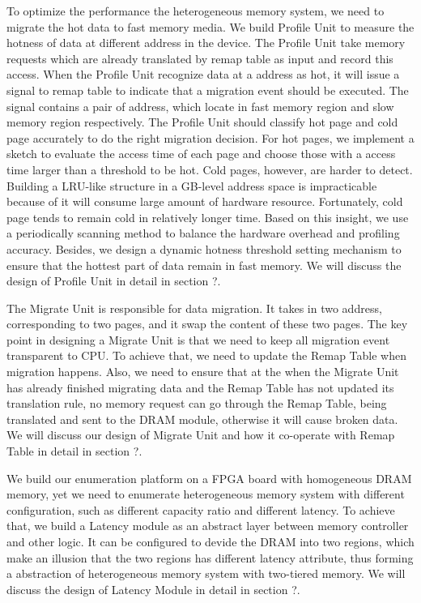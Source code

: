  To optimize the performance the heterogeneous memory system, we need to migrate the hot data to fast memory media. We build Profile Unit to measure the hotness of data at different address in the device. The Profile Unit take memory requests which are already translated by remap table as input and record this access. When the Profile Unit recognize data at a address as hot, it will issue a signal to remap table to indicate that a migration event should be executed. The signal contains a pair of address, which locate in fast memory region and slow memory region respectively. The Profile Unit should classify hot page and cold page accurately to do the right migration decision. For hot pages, we implement a sketch to evaluate the access time of each page and choose those with a access time larger than a threshold to be hot.
Cold pages, however, are harder to detect. Building a LRU-like structure in a GB-level address space is impracticable because of it will consume large amount of hardware resource. Fortunately, cold page tends to remain  cold in relatively longer time\cite{?}. Based on this insight, we use a periodically scanning method to balance the hardware overhead and profiling accuracy.
Besides, we design a dynamic hotness threshold setting mechanism to ensure that the hottest part of data remain in fast memory. We will discuss the design of Profile Unit in detail in section ?.

 The Migrate Unit is responsible for data migration. It takes in two address, corresponding to two pages, and it swap the content of these two pages. The key point in designing a Migrate Unit is that we need to keep all migration event transparent to CPU. To achieve that, we need to update the Remap Table when migration happens. Also, we need to ensure that at the when the Migrate Unit has already finished migrating data and the Remap Table has not updated its translation rule, no memory request can go through the Remap Table, being translated and sent to the DRAM module, otherwise it will cause broken data. We will discuss our design of Migrate Unit and how it co-operate with Remap Table in detail in section ?.

 We build our enumeration platform on a FPGA board with homogeneous DRAM memory, yet we need to enumerate heterogeneous memory system with different configuration, such as different capacity ratio and different latency. To achieve that, we build a Latency module as an abstract layer between memory controller and other logic. It can be configured to devide the DRAM into two regions, which make an illusion that the two regions has different latency attribute, thus forming a abstraction of heterogeneous memory system with two-tiered memory. We will discuss the design of Latency Module in detail in section ?. 

